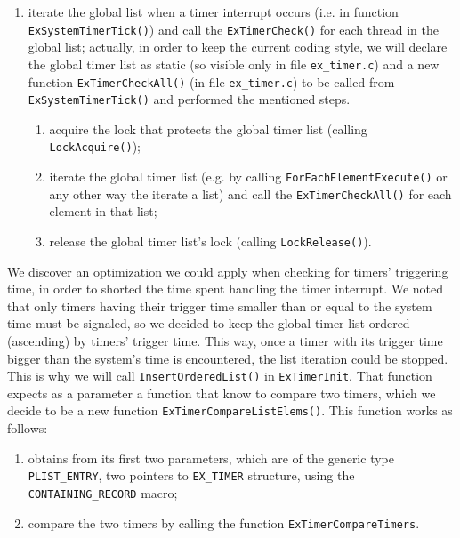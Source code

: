 \begin{enumerate}
        
    \item iterate the global list when a timer interrupt occurs (i.e. in function \lstinline|ExSystemTimerTick()|) and call the \lstinline|ExTimerCheck()| for each thread in the global list; actually, in order to keep the current coding style, we will declare the global timer list as static (so visible only in file \lstinline|ex_timer.c|) and a new function \lstinline|ExTimerCheckAll()| (in file \lstinline|ex_timer.c|) to be called from \lstinline|ExSystemTimerTick()| and performed the mentioned steps.
        \begin{enumerate}
            \item acquire the lock that protects the global timer list (calling \lstinline|LockAcquire()|);
            
            \item iterate the global timer list (e.g. by calling \lstinline|ForEachElementExecute()| or any other way the iterate a list) and call the \lstinline|ExTimerCheckAll()| for each element in that list;
            
            \item release the global timer list's lock (calling \lstinline|LockRelease()|).
        \end{enumerate}

\end{enumerate}

We discover an optimization we could apply when checking for timers' triggering time, in order to shorted the time spent handling the timer interrupt. We noted that only timers having their trigger time smaller than or equal to the system time must be signaled, so we decided to keep the global timer list ordered (ascending) by timers' trigger time. This way, once a timer with its trigger time bigger than the system's time is encountered, the list iteration could be stopped. This is why we will call \lstinline|InsertOrderedList()| in  \lstinline|ExTimerInit|. That function expects as a parameter a function that know to compare two timers, which we decide to be a new function \lstinline|ExTimerCompareListElems()|. This function works as follows:
\begin{enumerate}
    \item obtains from its first two parameters, which are of the generic type \lstinline|PLIST_ENTRY|, two pointers to \lstinline|EX_TIMER| structure, using the \lstinline|CONTAINING_RECORD| macro;
    
    \item compare the two timers by calling the function \lstinline|ExTimerCompareTimers|.
\end{enumerate}


